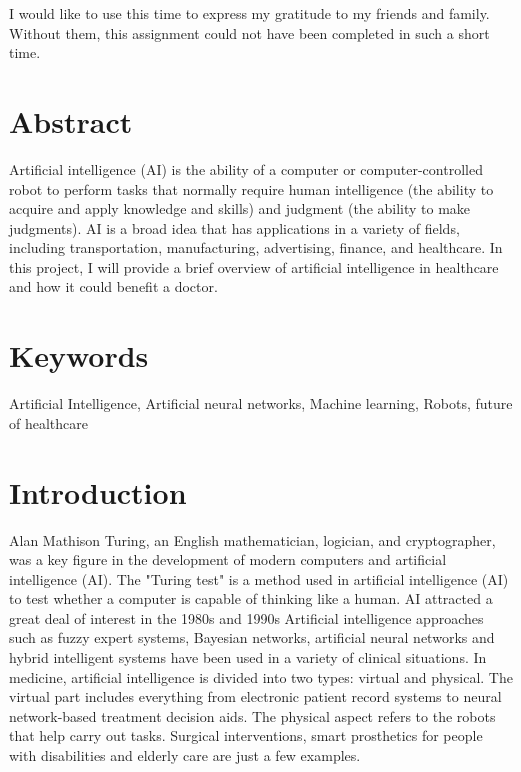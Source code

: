 \documentclass[12pt]{article}
\begin{document}
I would like to use this time to express my gratitude to my friends and family. 
Without them, this assignment could not have been completed in such a short time.


\clearpage


\section{Abstract}
\hspace{1cm}
Artificial intelligence (AI) is the ability of a computer or computer-controlled robot  to perform tasks that normally require human intelligence (the ability to acquire and apply knowledge and skills) and judgment (the ability to make judgments). AI is a broad idea that has applications in a variety of fields, including transportation, manufacturing, advertising, finance, and healthcare. In this  project, I will provide a brief overview of artificial intelligence in healthcare and how it could benefit a doctor.

\section{Keywords}

Artificial Intelligence, Artificial neural networks, Machine learning, Robots, future of healthcare

\section{Introduction}
\hspace{1cm}
Alan Mathison Turing, an English mathematician, logician, and cryptographer, was a key figure in the development of modern computers and artificial intelligence (AI). The "Turing test" is a method used in artificial intelligence (AI) to test whether  a computer is capable of thinking like a human. AI attracted a great deal of interest in the 1980s and 1990s Artificial intelligence approaches such as fuzzy expert systems, Bayesian networks, artificial neural networks and hybrid intelligent systems have been used in a variety of clinical situations.
 In medicine, artificial intelligence is divided into two types: virtual and physical. The virtual part includes everything from electronic patient record systems to neural network-based treatment decision aids. The physical aspect refers to the robots that help carry out tasks. Surgical interventions, smart prosthetics for people with disabilities and elderly care are just a few examples.
\end{document}
